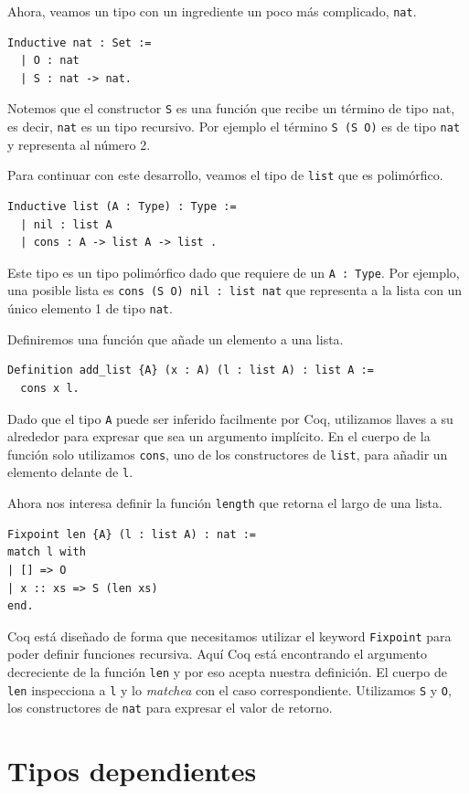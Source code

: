 Ahora, veamos un tipo con un ingrediente un poco más complicado, \lstinline{nat}.
\begin{lstlisting}
Inductive nat : Set :=
  | O : nat
  | S : nat -> nat.
\end{lstlisting}
Notemos que el constructor \lstinline{S} es una función que recibe un término de tipo {nat}, es decir, \lstinline{nat} es un tipo recursivo. Por ejemplo el término \lstinline{S (S O)} es de tipo \lstinline{nat} y representa al número 2.

Para continuar con este desarrollo, veamos el tipo de \lstinline{list} que es polimórfico.
\begin{lstlisting}
Inductive list (A : Type) : Type :=
  | nil : list A
  | cons : A -> list A -> list .
\end{lstlisting}
Este tipo es un tipo polimórfico dado que requiere de un \lstinline{A : Type}. Por ejemplo, una posible lista es \lstinline{cons (S O) nil : list nat} que representa a la lista con un único elemento 1 de tipo \lstinline{nat}.

Definiremos una función que añade un elemento a una lista.
\begin{lstlisting}
Definition add_list {A} (x : A) (l : list A) : list A :=
  cons x l.
\end{lstlisting}
Dado que el tipo \lstinline{A} puede ser inferido facilmente por Coq, utilizamos llaves a su alrededor para expresar que sea un argumento implícito. En el cuerpo de la función solo utilizamos \lstinline{cons}, uno de los constructores de \lstinline{list}, para añadir un elemento delante de \lstinline{l}.

Ahora nos interesa definir la función \lstinline{length} que retorna el largo de una lista.
\begin{lstlisting}
Fixpoint len {A} (l : list A) : nat :=
match l with
| [] => O
| x :: xs => S (len xs)
end.
\end{lstlisting}
Coq está diseñado de forma que necesitamos utilizar el keyword \lstinline{Fixpoint} para poder definir funciones recursiva. Aquí Coq está encontrando el argumento decreciente de la función \lstinline{len} y por eso acepta nuestra definición. El cuerpo de \lstinline{len} inspecciona a \lstinline{l} y lo \textit{matchea} con el caso correspondiente. Utilizamos \lstinline{S} y \lstinline{O}, los constructores de \lstinline{nat} para expresar el valor de retorno.

\section{Tipos dependientes}

